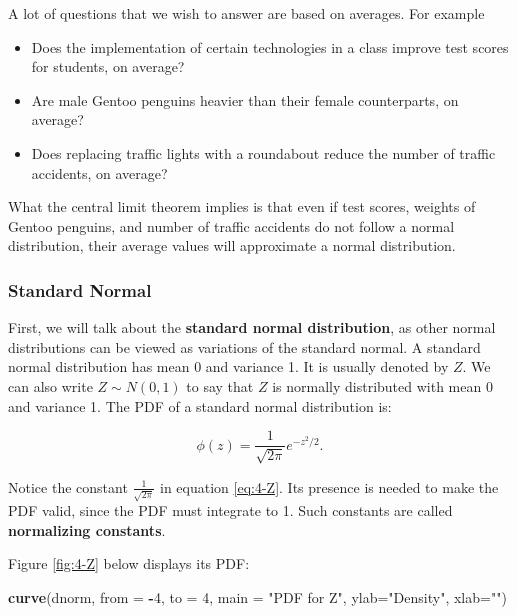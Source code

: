 \documentclass[
]{book}
\newenvironment{Shaded}{\begin{snugshade}}{\end{snugshade}}
\newcommand{\AttributeTok}[1]{\textcolor[rgb]{0.13,0.29,0.53}{#1}}
\newcommand{\DecValTok}[1]{\textcolor[rgb]{0.00,0.00,0.81}{#1}}
\newcommand{\FunctionTok}[1]{\textcolor[rgb]{0.13,0.29,0.53}{\textbf{#1}}}
\newcommand{\NormalTok}[1]{#1}
\newcommand{\SpecialCharTok}[1]{\textcolor[rgb]{0.81,0.36,0.00}{\textbf{#1}}}
\newcommand{\StringTok}[1]{\textcolor[rgb]{0.31,0.60,0.02}{#1}}
\providecommand{\tightlist}{%
  \setlength{\itemsep}{0pt}\setlength{\parskip}{0pt}}
\begin{document}
A lot of questions that we wish to answer are based on averages. For example

\begin{itemize}
\tightlist
\item
  Does the implementation of certain technologies in a class improve test scores for students, on average?
\item
  Are male Gentoo penguins heavier than their female counterparts, on average?
\item
  Does replacing traffic lights with a roundabout reduce the number of traffic accidents, on average?
\end{itemize}

What the central limit theorem implies is that even if test scores, weights of Gentoo penguins, and number of traffic accidents do not follow a normal distribution, their average values will approximate a normal distribution.

\subsubsection{Standard Normal}\label{standard-normal}

First, we will talk about the \textbf{standard normal distribution}, as other normal distributions can be viewed as variations of the standard normal. A standard normal distribution has mean 0 and variance 1. It is usually denoted by \(Z\). We can also write \(Z \sim N(0,1)\) to say that \(Z\) is normally distributed with mean 0 and variance 1. The PDF of a standard normal distribution is:

\begin{equation} 
\phi(z) = \frac{1}{\sqrt{2 \pi}} e^{-z^2/2}.
\label{eq:4-Z}
\end{equation}

Notice the constant \(\frac{1}{\sqrt{2 \pi}}\) in equation \eqref{eq:4-Z}. Its presence is needed to make the PDF valid, since the PDF must integrate to 1. Such constants are called \textbf{normalizing constants}.

Figure \ref{fig:4-Z} below displays its PDF:

\begin{Shaded}
\begin{Highlighting}[]
\FunctionTok{curve}\NormalTok{(dnorm, }\AttributeTok{from =} \SpecialCharTok{{-}}\DecValTok{4}\NormalTok{, }\AttributeTok{to =} \DecValTok{4}\NormalTok{, }\AttributeTok{main =} \StringTok{"PDF for Z"}\NormalTok{, }\AttributeTok{ylab=}\StringTok{"Density"}\NormalTok{, }\AttributeTok{xlab=}\StringTok{""}\NormalTok{)}
\end{Highlighting}
\end{Shaded}
\end{document}
